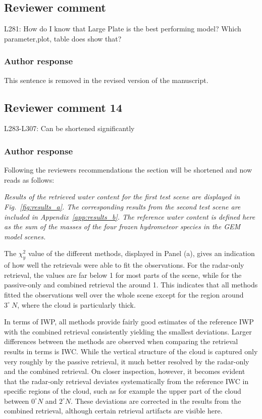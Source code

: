 \documentclass[11pt]{scrartcl}
\begin{document}
\subsection{Reviewer comment}
L281: How do I know that Large Plate is the best performing model? Which parameter,plot, table does show that?

\subsubsection*{Author response}

This sentence is removed in the revised version of the manuscript.



\subsection*{Reviewer comment 14}
L283-L307: Can be shortened significantly

\subsubsection*{Author response}

Following the reviewers recommendations the section will be shortened and
now  reads as follows:

{\itshape
Results of the retrieved water content for the first test scene are displayed in
Fig.~\ref{fig:results_a}. The corresponding results from the second test scene
are included in Appendix~\ref{app:results_b}. The reference water content is
defined here as the sum of the masses of the four frozen hydrometeor species in
the GEM model scenes.

The $\chi^2_y$ value of the different methods, displayed
in Panel (a), gives an indication of how well the retrievals were able to fit
the observations. For the radar-only retrieval, the values are far below 1
for most parts of the scene, while for the passive-only and combined retrieval
the around 1. This indicates that all methods fitted the observations well over
the whole scene except for the region around $3^\circ\ N$, where the cloud
is particularly thick.

In terms of IWP, all methods provide fairly good estimates of the reference IWP
with the combined retrieval consistently yielding the smallest deviations.
Larger differences between the methods are observed when comparing the retrieval
results in terms is IWC. While the vertical structure of the cloud is captured
only very roughly by the passive retrieval, it much better resolved by the
radar-only and the combined retrieval. On closer inspection, however, it becomes
evident that the radar-only retrieval deviates systematically from the reference
IWC in specific regions of the cloud, such as for example the upper part of the
cloud between $0^\circ N$ and $2^\circ N$. These deviations are corrected in
the results from the combined retrieval, although certain retrieval artifacts
are visible here.}
\end{document}
